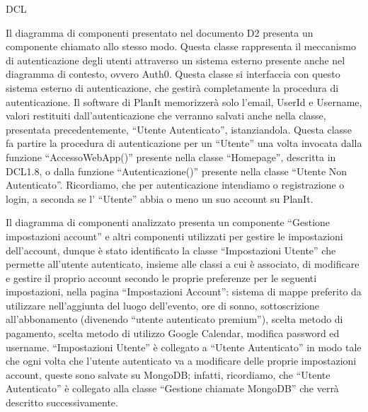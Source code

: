 \begin{listaPersonale}{DCL}
    
    
    Il diagramma di componenti presentato nel documento D2 presenta un componente chiamato allo stesso modo. Questa classe rappresenta il meccanismo di autenticazione degli utenti attraverso un sistema esterno presente anche nel diagramma di contesto, ovvero Auth0. Questa classe si interfaccia con questo sistema esterno di autenticazione, che gestirà completamente la procedura di autenticazione. Il software di PlanIt memorizzerà solo l'email, UserId e Username, valori restituiti dall'autenticazione che verranno salvati anche nella classe, presentata precedentemente, “Utente Autenticato”, istanziandola. Questa classe fa partire la procedura di autenticazione per un “Utente” una volta invocata dalla funzione “AccessoWebApp()” presente nella classe “Homepage”, descritta in DCL1.8, o dalla funzione “Autenticazione()” presente nella classe “Utente Non Autenticato”. Ricordiamo, che per autenticazione intendiamo o registrazione o login, a seconda se l' “Utente” abbia o meno un suo account su PlanIt.
    
    
        \begin{center}
            
        \end{center}
    
        

    Il diagramma di componenti analizzato presenta un componente “Gestione impostazioni account” e altri componenti utilizzati per gestire le impostazioni dell'account, dunque è stato identificato la classe “Impostazioni Utente” che permette all'utente autenticato, insieme alle classi a cui è associato, di modificare e gestire il proprio account secondo le proprie preferenze per le seguenti impostazioni, nella pagina “Impostazioni Account”: sistema di mappe preferito da utilizzare nell'aggiunta del luogo dell'evento, ore di sonno, sottoscrizione all'abbonamento (divenendo “utente autenticato premium”), scelta metodo di pagamento, scelta metodo di utilizzo Google Calendar, modifica password ed username.
    “Impostazioni Utente” è collegato a “Utente Autenticato” in modo tale che ogni volta che l'utente autenticato va a modificare delle proprie impostazioni account, queste sono salvate su MongoDB; infatti, ricordiamo, che “Utente Autenticato” è collegato alla classe “Gestione chiamate MongoDB” che verrà descritto successivamente.
    

\end{listaPersonale}

